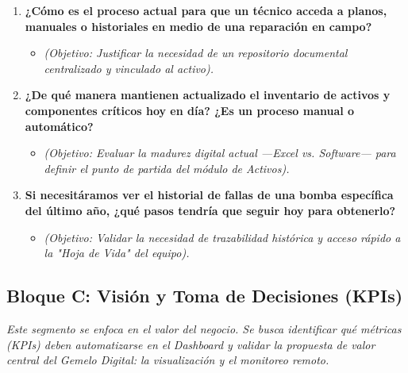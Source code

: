 \documentclass[12pt, a4paper]{article}
\begin{document}
\begin{enumerate}
    \item \textbf{¿Cómo es el proceso actual para que un técnico acceda a planos, manuales o historiales en medio de una reparación en campo?}
    \begin{itemize}
        \item \textit{(Objetivo: Justificar la necesidad de un repositorio documental centralizado y vinculado al activo).}
    \end{itemize}
    \item \textbf{¿De qué manera mantienen actualizado el inventario de activos y componentes críticos hoy en día? ¿Es un proceso manual o automático?}
    \begin{itemize}
        \item \textit{(Objetivo: Evaluar la madurez digital actual —Excel vs. Software— para definir el punto de partida del módulo de Activos).}
    \end{itemize}
    \item \textbf{Si necesitáramos ver el historial de fallas de una bomba específica del último año, ¿qué pasos tendría que seguir hoy para obtenerlo?}
    \begin{itemize}
        \item \textit{(Objetivo: Validar la necesidad de trazabilidad histórica y acceso rápido a la "Hoja de Vida" del equipo).}
    \end{itemize}
\end{enumerate}

\subsection{Bloque C: Visión y Toma de Decisiones (KPIs)}

\textit{Este segmento se enfoca en el valor del negocio. Se busca identificar qué métricas (KPIs) deben automatizarse en el Dashboard y validar la propuesta de valor central del Gemelo Digital: la visualización y el monitoreo remoto.}
\end{document}
